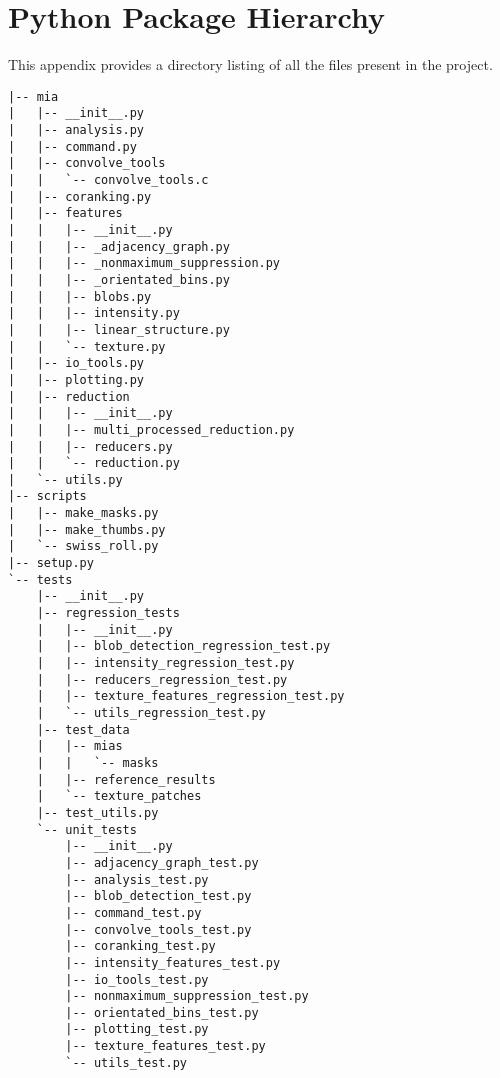 \chapter{Python Package Hierarchy}

This appendix provides a directory listing of all the files present in the project.
\begin{verbatim}
|-- mia
|   |-- __init__.py
|   |-- analysis.py
|   |-- command.py
|   |-- convolve_tools
|   |   `-- convolve_tools.c
|   |-- coranking.py
|   |-- features
|   |   |-- __init__.py
|   |   |-- _adjacency_graph.py
|   |   |-- _nonmaximum_suppression.py
|   |   |-- _orientated_bins.py
|   |   |-- blobs.py
|   |   |-- intensity.py
|   |   |-- linear_structure.py
|   |   `-- texture.py
|   |-- io_tools.py
|   |-- plotting.py
|   |-- reduction
|   |   |-- __init__.py
|   |   |-- multi_processed_reduction.py
|   |   |-- reducers.py
|   |   `-- reduction.py
|   `-- utils.py
|-- scripts
|   |-- make_masks.py
|   |-- make_thumbs.py
|   `-- swiss_roll.py
|-- setup.py
`-- tests
    |-- __init__.py
    |-- regression_tests
    |   |-- __init__.py
    |   |-- blob_detection_regression_test.py
    |   |-- intensity_regression_test.py
    |   |-- reducers_regression_test.py
    |   |-- texture_features_regression_test.py
    |   `-- utils_regression_test.py
    |-- test_data
    |   |-- mias
    |   |   `-- masks
    |   |-- reference_results
    |   `-- texture_patches
    |-- test_utils.py
    `-- unit_tests
        |-- __init__.py
        |-- adjacency_graph_test.py
        |-- analysis_test.py
        |-- blob_detection_test.py
        |-- command_test.py
        |-- convolve_tools_test.py
        |-- coranking_test.py
        |-- intensity_features_test.py
        |-- io_tools_test.py
        |-- nonmaximum_suppression_test.py
        |-- orientated_bins_test.py
        |-- plotting_test.py
        |-- texture_features_test.py
        `-- utils_test.py
\end{verbatim}
